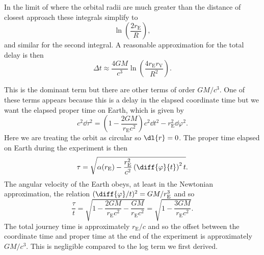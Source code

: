 \documentclass[fleqn]{NotesClass}
\begin{document}
    In the limit of where the orbital radii are much greater than the distance of closest approach these integrals simplify to
    \begin{equation}
        \ln\left( \frac{2r_{\mathrm{E}}}{R} \right),
    \end{equation}
    and similar for the second integral.
    A reasonable approximation for the total delay is then
    \begin{equation}
        \Delta t \approx \frac{4GM}{c^3} \ln\left( \frac{4r_{\mathrm{E}}r_{\mathrm{V}}}{R^2} \right).
    \end{equation}
    
    This is the dominant term but there are other terms of order \(GM/c^3\).
    One of these terms appears because this is a delay in the elapsed coordinate time but we want the elapsed proper time on Earth, which is given by
    \begin{equation}
        c^2 \dd{\tau}^2 = \left( 1 - \frac{2GM}{r_{\mathrm{E}}c^2} \right)c^2\dd{t}^2 - r_{\mathrm{E}}^2\dd{\varphi}^2.
    \end{equation}
    Here we are treating the orbit as circular so \(\dl{r} = 0\).
    The proper time elapsed on Earth during the experiment is then
    \begin{equation}
        \tau = \sqrt{\alpha(r_{\mathrm{E}}) - \frac{r_{\mathrm{E}}^2}{c^2} \left( \diff{\varphi}{t} \right)^2 t}.
    \end{equation}
    The angular velocity of the Earth obeys, at least in the Newtonian approximation, the relation \((\diff{\varphi}/{t})^2 = GM/r_{\mathrm{E}}^3\) and so
    \begin{equation}
        \frac{\tau}{t} = \sqrt{1 - \frac{2GM}{r_{\mathrm{E}}c^2} - \frac{GM}{r_{\mathrm{E}}c^2}} = \sqrt{1 - \frac{3GM}{r_{\mathrm{E}}c^2}}.
    \end{equation}
    The total journey time is approximately \(r_{\mathrm{E}}/c\) and so the offset between the coordinate time and proper time at the end of the experiment is approximately \(GM/c^3\).
    This is negligible compared to the log term we first derived.
    
\end{document}
